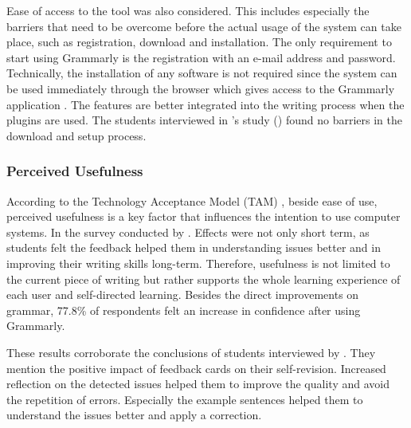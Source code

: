 \documentclass[runningheads]{llncs}
\let\OldTextregistered\textregistered
\renewcommand{\textregistered}{\OldTextregistered\xspace}
\begin{document}
Ease of access to the tool was also considered. This includes especially the barriers that need to be overcome before the actual usage of the system can take place, such as registration, download and installation. The only requirement to start using Grammarly\textregistered is the registration with an e-mail address and password. Technically, the installation of any software is not required since the system can be used immediately through the browser which gives access to the Grammarly\textregistered application \citep{noauthor_grammarly_nodate}. The features are better integrated into the writing process when the plugins are used. The students interviewed in \citeauthor{nova_utilizing_2018}'s study (\citeyear{nova_utilizing_2018}) found no barriers in the download and setup process.

\subsubsection{Perceived Usefulness} 
According to the Technology Acceptance Model (TAM) \citep{davis_user_1989}, beside ease of use, perceived usefulness is a key factor that influences the intention to use computer systems. In the survey conducted by \citeauthor{cavaleri_you_2016} . Effects were not only short term, as students felt the feedback helped them in understanding issues better and in improving their writing skills long-term. Therefore, usefulness is not limited to the current piece of writing but rather supports the whole learning experience of each user and self-directed learning. Besides the direct improvements on grammar, 77.8\% of respondents felt an increase in confidence after using Grammarly\textregistered. 

These results corroborate the conclusions of students interviewed by \textcite{nova_utilizing_2018}. They mention the positive impact of feedback cards on their self-revision. Increased reflection on the detected issues helped them to improve the quality and avoid the repetition of errors. Especially the example sentences helped them to understand the issues better and apply a correction.
\end{document}
